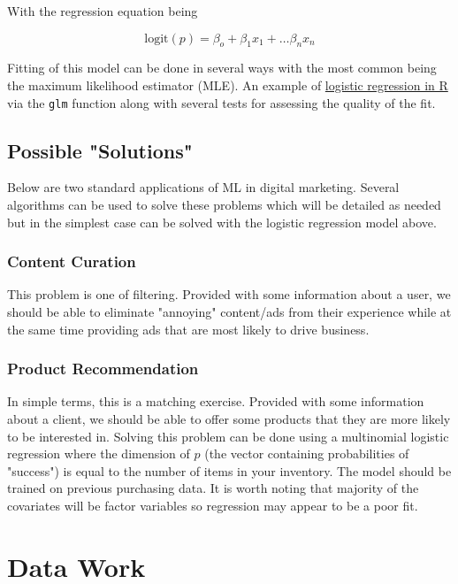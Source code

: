 \documentclass[12pt,a4paper]{book}
\newcommand{\logit}{\text{logit}}
\begin{document}
With the regression equation being

\begin{equation}
    \logit(p) = \beta_o + \beta_1 x_1 + \ldots \beta_n x_n
\end{equation}

Fitting of this model can be done in several ways with the most common being the maximum likelihood estimator (MLE). An example of \href{https://stats.idre.ucla.edu/r/dae/logit-regression/}{logistic regression in R} via the \texttt{glm} function along with several tests for assessing the quality of the fit. 

\section{Possible "Solutions"}

Below are two standard applications of ML in digital marketing. Several algorithms can be used to solve these problems which will be detailed as needed but in the simplest case can be solved with the logistic regression model above. 

\subsection{Content Curation}
This problem is one of filtering. Provided with some information about a user, we should be able to eliminate "annoying" content/ads from their experience while at the same time providing ads that are most likely to drive business. 

\subsection{Product Recommendation}
In simple terms, this is a matching exercise. Provided with some information about a client, we should be able to offer some products that they are more likely to be interested in. Solving this problem can be done using a multinomial logistic regression where the dimension of $p$ (the vector containing probabilities of "success") is equal to the number of items in your inventory. The model should be trained on previous purchasing data. It is worth noting that majority of the covariates will be factor variables so regression may appear to be a poor fit. 

\chapter{Data Work}
\end{document}
